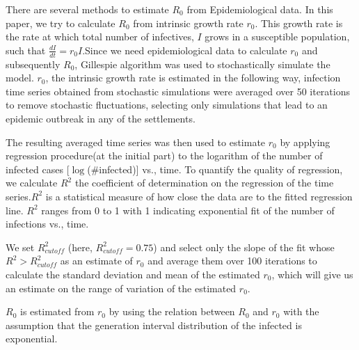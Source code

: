 \documentclass{article}
\begin{document}

There are several methods to estimate $R_{0}$ from
Epidemiological data. In this paper, we try to calculate $R_{0}$ from
intrinsic growth rate $r_{0}$. This growth rate is the rate at which                                             %
total number of infectives, $I$ grows in a susceptible population,
such that $\frac{dI}{dt}=r_{0}I$.Since we need epidemiological data to
calculate $r_{0}$ and subsequently $R_{0}$, Gillespie algorithm was                                                       %
used to stochastically simulate the model.                                                                          %
$r_{0}$, the intrinsic growth rate is estimated in the following way,
infection time series obtained from stochastic simulations were averaged
over 50 iterations to remove stochastic fluctuations, selecting only
simulations that lead to an epidemic outbreak in any of the
settlements.

The resulting averaged time series was then used to estimate $r_{0}$ by
applying regression procedure(at the initial part) to the logarithm of the
number of infected cases [$\log$(\#infected)] vs., time. To quantify the
quality of regression, we calculate $R^{2}$ the coefficient of
determination on the regression of the time series.$R^{2}$ is a
statistical measure of how close the data are to the fitted regression
line. $R^{2}$ ranges from 0 to 1 with 1 indicating exponential fit of
the number of infections vs., time.

We set $R^{2}_{cutoff}$ (here, $R^{2}_{cutoff}=0.75$) and select only
the slope of the fit whose $R^{2} > R^{2}_{cutoff}$ as an estimate of
$r_{0}$ and average them over 100 iterations to calculate the standard
deviation and mean of the estimated $r_{0}$, which will give us an
estimate on the range of variation of the estimated $r_{0}$. \par

$R_{0}$ is estimated from $r_{0}$ by using the relation                                           %
between $R_{0}$ and $r_{0}$ with the assumption that the
generation interval distribution of the infected is exponential.                                             %
\end{document}
